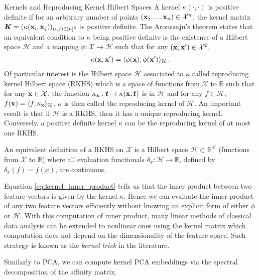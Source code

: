 \begin{mem1}{Kernels and Reproducing Kernel Hilbert Spaces}\label{rem:kernels}
	A kernel $\kappa(\cdot, \cdot)$ is positive definite if for an arbitrary number of points $({\mathbf{x}}_1, ..., {\mathbf{x}}_n) \in \mathcal{X}^n$, the kernel matrix $\bm{K} = (\kappa({\mathbf{x}}_i, {\mathbf{x}}_j))_{(i,j) \in [n]^2}$ is positive definite. The Aronszajn's theorem \citep{aronszajn1950theory} states that an equivalent condition to $\kappa$ being positive definite is the existence of a Hilbert space $\mathcal{H}$ and a mapping $\phi : \mathcal{X} \to \mathcal{H}$ such that for any $({\mathbf{x}}, {\mathbf{x}}') \in \mathcal{X}^2$,
\begin{align}\label{eq:kernel_inner_product}
    \kappa({\mathbf{x}}, {\mathbf{x}}') = \langle \phi({\mathbf{x}}), \phi({\mathbf{x}}') \rangle_{\mathcal{H}} \:.
\end{align}
Of particular interest is the Hilbert space $\mathcal{H}$ associated to $\kappa$ called reproducing kernel Hilbert space (RKHS) which is a space of functions from $\mathcal{X}$ to $\mathbb{R}$ such that for any ${\mathbf{x}} \in \mathcal{X}$, the function $\kappa_{{\mathbf{x}}} : \bm{t} \to \kappa({\mathbf{x}}, \bm{t})$ is in $\mathcal{H}$ and for any $f \in \mathcal{H}$, $f({\mathbf{x}}) = \langle f, \kappa_{{\mathbf{x}}} \rangle_{\mathcal{H}}$. $\kappa$ is then called the reproducing kernel of $\mathcal{H}$. An important result is that if $\mathcal{H}$ is a RKHS, then it has a unique reproducing kernel. Conversely, a positive definite kernel $\kappa$ can be the reproducing kernel of at most one RKHS.

An equivalent definition of a RKHS on $\mathcal{X}$ is a Hilbert
space $\mathcal{H} \subset \mathbb{R}^{\mathcal{X}}$ (functions from $\mathcal{X}$ to $\mathbb{R}$) where all evaluation functionals $\delta_x : \mathcal{H} \to \mathbb{R}$,
defined by $\delta_x(f) = f(x)$, are continuous.

Equation \ref{eq:kernel_inner_product} tells us that the inner product between two feature vectors is given by the kernel $\kappa$. Hence we can evaluate the inner product of any two feature vectors efficiently without knowing an explicit form of either $\phi$ or $\mathcal{H}$. With this computation of inner product, many linear methods of classical data analysis can be extended to nonlinear ones using the kernel matrix which computation does not depend on the dimensionality of the feature space. Such strategy is known as the \textit{kernel trick} in the literature.
\end{mem1}

Similarly to PCA, we can compute kernel PCA embeddings via the spectral decomposition of the affinity matrix.

